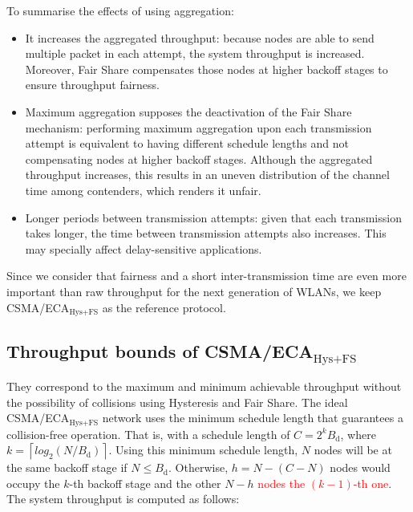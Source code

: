 	To summarise the effects of using aggregation:
	\begin{itemize}
		\item It increases the aggregated throughput: because nodes are able to send multiple packet in each attempt, the system throughput is increased. Moreover, Fair Share compensates those nodes at higher backoff stages to ensure throughput fairness.
		\item Maximum aggregation supposes the deactivation of the Fair Share mechanism: performing maximum aggregation upon each transmission attempt is equivalent to having different schedule lengths and not compensating nodes at higher backoff stages. Although the aggregated throughput increases, this results in an uneven distribution of the channel time among contenders, which renders it unfair.
		\item Longer periods between transmission attempts: given that each transmission takes longer, the time between transmission attempts also increases. This may specially affect delay-sensitive applications.
	\end{itemize}

	
	Since we consider that fairness and a short inter-transmission time are even more important than raw throughput for the next generation of WLANs, we keep CSMA/ECA$_{\text{Hys+FS}}$ as the reference protocol.
	
	\subsection{Throughput bounds of CSMA/ECA$_{\text{Hys+FS}}$}\label{ECA-bounds}
	
	They correspond to the maximum and minimum achievable throughput without the possibility of collisions using Hysteresis and Fair Share. The ideal CSMA/ECA$_{\text{Hys+FS}}$ network uses the minimum schedule length that guarantees a collision-free operation. That is, with a schedule length of $C=2^{k}B_{\text{d}}$, where $k = \left\lceil log_{2}(N/B_{\text{d}})\right\rceil$. Using this minimum schedule length, $N$ nodes will be at the same backoff stage if $N\leq B_{\text{d}}$. Otherwise, $h = N-(C-N)$ nodes would occupy the $k$-th backoff stage and the other $N-h$ \textcolor{red}{nodes the $(k-1)$-th one}. The system throughput is computed as follows:
	
